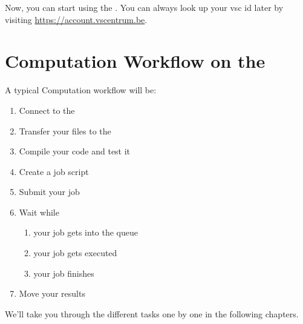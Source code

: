 Now, you can start using the \hpc. You can always look up your vsc id later by visiting \url{https://account.vscentrum.be}.

\section{Computation Workflow on the \hpc}
\label{sec:compuation-workflow-on-the-hpc}

A typical Computation workflow will be:

\begin{enumerate}
  \item  Connect to the \hpc
  \item  Transfer your files to the \hpc
  \item  Compile your code and test it
  \item  Create a job script
  \item  Submit your job
  \item  Wait while
  \begin{enumerate}
    \item  your job gets into the queue
    \item  your job gets executed
    \item  your job finishes
  \end{enumerate}
  \item  Move your results
\end{enumerate}

We'll take you through the different tasks one by one in the following
chapters.
